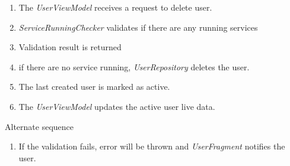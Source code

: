 \begin{enumerate}
    \item The \emph{UserViewModel} receives a request to delete user.
    \item \emph{ServiceRunningChecker} validates if there are any running services
    \item Validation result is returned
    \item if there are no service running, \emph{UserRepository} deletes the user.
    \item The last created user is marked as active.
    \item The \emph{UserViewModel} updates the active user live data.
\end{enumerate}

Alternate sequence
\begin{enumerate}[start=4]
    \item If the validation fails, error will be thrown and \emph{UserFragment} notifies the user.
\end{enumerate}